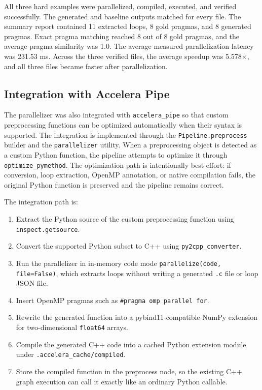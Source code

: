 \documentclass[11pt,a4paper]{article}
\newcommand{\modulepath}[1]{\texttt{#1}}
\begin{document}
All three hard examples were parallelized, compiled, executed, and verified
successfully. The generated and baseline outputs matched for every file. The
summary report contained 11 extracted loops, 8 gold pragmas, and 8 generated
pragmas. Exact pragma matching reached 8 out of 8 gold pragmas, and the
average pragma similarity was 1.0. The average measured parallelization
latency was 231.53 ms. Across the three verified files, the average speedup
was 5.578$\times$, and all three files became faster after parallelization.

\subsection{Integration with Accelera Pipe}

The parallelizer was also integrated with \texttt{accelera\_pipe} so that
custom preprocessing functions can be optimized automatically when their
syntax is supported. The integration is implemented through the
\texttt{Pipeline.preprocess} builder and the \texttt{parallelizer} utility.
When a preprocessing object is detected as a custom Python function, the
pipeline attempts to optimize it through \texttt{optimize\_pymethod}. The
optimization path is intentionally best-effort: if conversion, loop extraction,
OpenMP annotation, or native compilation fails, the original Python function
is preserved and the pipeline remains correct.

The integration path is:

\begin{enumerate}[leftmargin=*]
  \item Extract the Python source of the custom preprocessing function using
        \texttt{inspect.getsource}.
  \item Convert the supported Python subset to C++ using
        \texttt{py2cpp\_converter}.
  \item Run the parallelizer in in-memory code mode
        \texttt{parallelize(code, file=False)}, which extracts loops without
        writing a generated \texttt{.c} file or loop JSON file.
  \item Insert OpenMP pragmas such as \texttt{\#pragma omp parallel for}.
  \item Rewrite the generated function into a pybind11-compatible NumPy
        extension for two-dimensional \texttt{float64} arrays.
  \item Compile the generated C++ code into a cached Python extension module
        under \modulepath{.accelera\_cache/compiled}.
  \item Store the compiled function in the preprocess node, so the existing
        C++ graph execution can call it exactly like an ordinary Python
        callable.
\end{enumerate}
\end{document}
